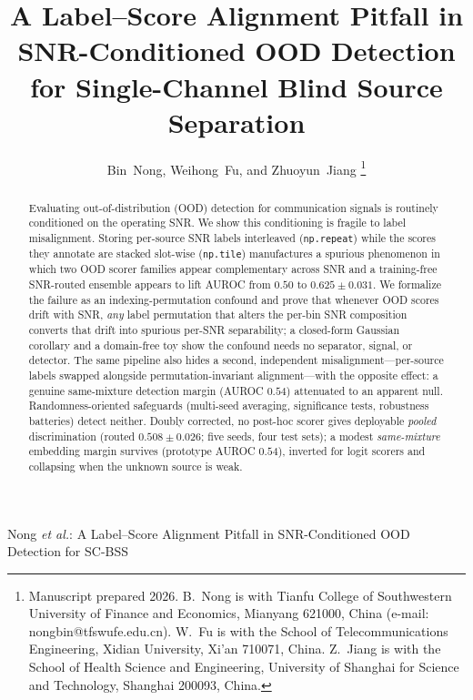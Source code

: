 \documentclass[journal,letterpaper]{IEEEtran}
\begin{document}
\title{A Label--Score Alignment Pitfall in SNR-Conditioned OOD
Detection for Single-Channel Blind Source Separation}

\author{Bin~Nong, Weihong~Fu, and Zhuoyun~Jiang%
\thanks{Manuscript prepared 2026. B.~Nong is with Tianfu College of
Southwestern University of Finance and Economics, Mianyang 621000, China
(e-mail: nongbin@tfswufe.edu.cn). W.~Fu is with the School of
Telecommunications Engineering, Xidian University, Xi'an 710071, China.
Z.~Jiang is with the School of Health Science and Engineering,
University of Shanghai for Science and Technology, Shanghai 200093,
China.}}

%
{Nong \MakeLowercase{\textit{et al.}}: A Label--Score Alignment
Pitfall in SNR-Conditioned OOD Detection for SC-BSS}

\maketitle

\begin{abstract}
Evaluating out-of-distribution (OOD) detection for communication
signals is routinely conditioned on the operating SNR\@. We show this
conditioning is fragile to label misalignment. Storing per-source SNR
labels interleaved (\texttt{np.repeat}) while the scores they annotate
are stacked slot-wise (\texttt{np.tile}) manufactures a spurious
phenomenon in which two OOD scorer families appear complementary
across SNR and a training-free SNR-routed ensemble appears to lift
AUROC from $0.50$ to $0.625 \pm 0.031$. We formalize the failure as an
indexing-permutation confound and prove that whenever OOD scores drift
with SNR, \emph{any} label permutation that alters the per-bin SNR
composition converts that drift into spurious per-SNR separability; a
closed-form Gaussian corollary and a domain-free toy show the confound
needs no separator, signal, or detector. The same pipeline also hides
a second, independent misalignment---per-source labels swapped
alongside permutation-invariant alignment---with the opposite effect:
a genuine same-mixture detection margin (AUROC $0.54$) attenuated to
an apparent null. Randomness-oriented safeguards (multi-seed averaging,
significance tests, robustness batteries) detect neither.
Doubly corrected, no post-hoc
scorer gives deployable \emph{pooled} discrimination (routed
$0.508 \pm 0.026$; five seeds, four test sets);
a modest \emph{same-mixture} embedding margin
survives (prototype AUROC $0.54$), inverted for logit scorers and
collapsing when the unknown source is weak.
\end{abstract}
\end{document}
